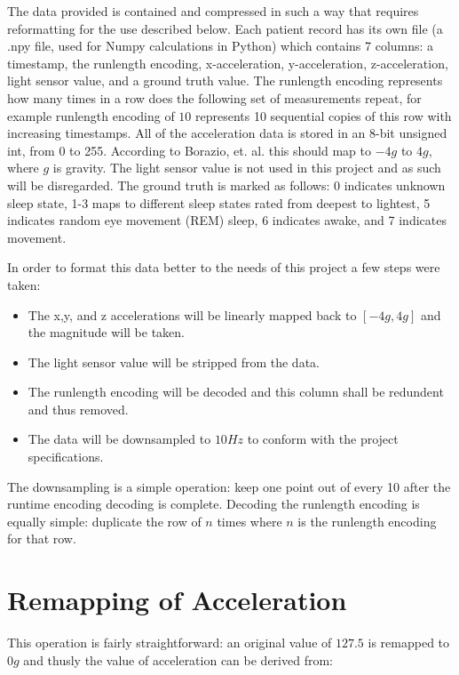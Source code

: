         The data provided is contained and compressed in such a way that requires reformatting for the use described below. Each patient record has its own file (a .npy file, used for Numpy calculations in Python) which contains 7 columns: a timestamp, the runlength encoding, x-acceleration, y-acceleration, z-acceleration, light sensor value, and a ground truth value. The runlength encoding represents how many times in a row does the following set of measurements repeat, for example runlength encoding of $10$ represents 10 sequential copies of this row with increasing timestamps. All of the acceleration data is stored in an 8-bit unsigned int, from 0 to 255. According to Borazio, et. al. this should map to $-4g$ to $4g$, where $g$ is gravity. The light sensor value is not used in this project and as such will be disregarded. The ground truth is marked as follows: 0 indicates unknown sleep state, 1-3 maps to different sleep states rated from deepest to lightest, 5 indicates random eye movement (REM) sleep, 6 indicates awake, and 7 indicates movement.

        In order to format this data better to the needs of this project a few steps were taken:

        \begin{itemize}
            \item The x,y, and z accelerations will be linearly mapped back to $[-4g,4g]$ and the magnitude will be taken.
            \item The light sensor value will be stripped from the data.
            \item The runlength encoding will be decoded and this column shall be redundent and thus removed.
            \item The data will be downsampled to $10Hz$ to conform with the project specifications.
        \end{itemize}

        The downsampling is a simple operation: keep one point out of every 10 after the runtime encoding decoding is complete. Decoding the runlength encoding is equally simple: duplicate the row of $n$ times where $n$ is the runlength encoding for that row.

        \section{Remapping of Acceleration}

            This operation is fairly straightforward: an original value of $127.5$ is remapped to $0g$ and thusly the value of acceleration can be derived from:

